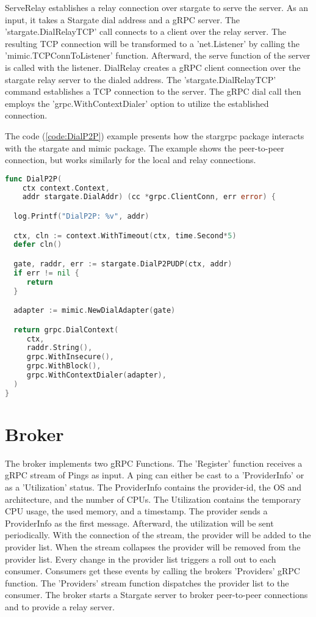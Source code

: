 ServeRelay establishes a relay connection over stargate to serve the server. As an input, it takes a Stargate dial address and a gRPC server. The 'stargate.DialRelayTCP' call connects to a client over the relay server. The resulting TCP connection will be transformed to a 'net.Listener' by calling the 'mimic.TCPConnToListener' function. Afterward, the serve function of the server is called with the listener. DialRelay creates a gRPC client connection over the stargate relay server to the dialed address. The 'stargate.DialRelayTCP' command establishes a TCP connection to the server. The gRPC dial call then employs the 'grpc.WithContextDialer' option to utilize the established connection.

The code (\ref{code:DialP2P}) example presents how the stargrpc package interacts with the stargate and mimic package. The example shows the peer-to-peer connection, but works similarly for the local and relay connections.

\newpage
\begin{lstlisting}[caption={Example of how the stargrpc package interacts with the stargate and mimic package}, label={code:DialP2P}, language=Go]
func DialP2P(
    ctx context.Context,
    addr stargate.DialAddr) (cc *grpc.ClientConn, err error) {

  log.Printf("DialP2P: %v", addr)

  ctx, cln := context.WithTimeout(ctx, time.Second*5)
  defer cln()

  gate, raddr, err := stargate.DialP2PUDP(ctx, addr)
  if err != nil {
     return
  }

  adapter := mimic.NewDialAdapter(gate)

  return grpc.DialContext(
     ctx,
     raddr.String(),
     grpc.WithInsecure(),
     grpc.WithBlock(),
     grpc.WithContextDialer(adapter),
  )
}
\end{lstlisting}

\section{Broker}
The broker implements two gRPC Functions. The 'Register' function receives a gRPC stream of Pings as input. A ping can either be cast to a 'ProviderInfo' or as a 'Utilization' status. The ProviderInfo contains the provider-id, the OS and architecture, and the number of CPUs. The Utilization contains the temporary CPU usage, the used memory, and a timestamp. The provider sends a ProviderInfo as the first message. Afterward, the utilization will be sent periodically. With the connection of the stream, the provider will be added to the provider list. When the stream collapses the provider will be removed from the provider list. Every change in the provider list triggers a roll out to each consumer. Consumers get these events by calling the brokers 'Providers' gRPC function. The 'Providers' stream function dispatches the provider list to the consumer. The broker starts a Stargate server to broker peer-to-peer connections and to provide a relay server.

